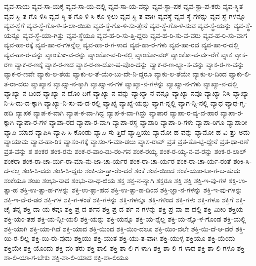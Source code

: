 {ವ್ಯವ-ಸಾಯ
ವ್ಯವ-ಸಾ-ಯಕ್ಕೆ
ವ್ಯವ-ಸಾ-ಯ-ದಲ್ಲಿ
ವ್ಯವ-ಸಾ-ಯ-ವನ್ನು
ವ್ಯವ-ಸ್ಥಾ-ಪಕ
ವ್ಯವ-ಸ್ಥಾ-ಪ-ಕರು
ವ್ಯವ-ಸ್ಥಿತ
ವ್ಯವ-ಸ್ಥಿ-ತ-ಗೊ-ಳಿಸಿ
ವ್ಯವ-ಸ್ಥಿ-ತ-ಗೊ-ಳಿ-ಸಿ-ಕೊ-ಳ್ಳಲು
ವ್ಯವ-ಸ್ಥಿ-ತ-ವಾಗಿ
ವ್ಯವಸ್ಥೆ
ವ್ಯವ-ಸ್ಥೆ-ಗಳನ್ನು
ವ್ಯವ-ಸ್ಥೆ-ಗಳನ್ನೂ
ವ್ಯವ-ಸ್ಥೆಗೆ
ವ್ಯವ-ಸ್ಥೆ-ಗೊ-ಳಿ-ಸ-ಲಾ-ಯಿತು
ವ್ಯವ-ಸ್ಥೆ-ಗೊ-ಳಿ-ಸು-ತ್ತೇನೆ
ವ್ಯವ-ಸ್ಥೆ-ಗೊ-ಳಿ-ಸುವ
ವ್ಯವ-ಸ್ಥೆ-ಯನ್ನು
ವ್ಯವ-ಸ್ಥೆ-ಯನ್ನೂ
ವ್ಯವ-ಸ್ಥೆ-ಯಾ-ಗಿತ್ತು
ವ್ಯವ-ಸ್ಥೆಯೂ
ವ್ಯವ-ಹ-ರಿ-ಸು-ತ್ತಿ-ದ್ದರು
ವ್ಯವ-ಹ-ರಿ-ಸು-ವ-ವರು
ವ್ಯವ-ಹ-ರಿ-ಸು-ವಾಗ
ವ್ಯವ-ಹಾ-ರಕ್ಕೆ
ವ್ಯವ-ಹಾ-ರ-ಗಳನ್ನೆಲ್ಲ
ವ್ಯವ-ಹಾ-ರ-ಗ-ಳಾದ
ವ್ಯವ-ಹಾ-ರ-ಗಳು
ವ್ಯವ-ಹಾ-ರದ
ವ್ಯವ-ಹಾ-ರ-ದಲ್ಲಿ
ವ್ಯವ-ಹಾ-ರ-ವನ್ನು
ವ್ಯಾಂಕೋ-ವ-ರನ್ನು
ವ್ಯಾಂಕೋ-ವ-ರಿ-ನಲ್ಲಿ
ವ್ಯಾಂಕೋ-ವರ್
ವ್ಯಾಂಕೋ-ವ-ರ್ವ-ರೆಗೆ
ವ್ಯಾಕ
ವ್ಯಾಕ-ರಣ
ವ್ಯಾಕ-ರ-ಣಕ್ಕೆ
ವ್ಯಾಕ-ರ-ಣದ
ವ್ಯಾಕ-ರ-ಣ-ದೋ-ಷ-ವೊಂ-ದನ್ನು
ವ್ಯಾಕ-ರ-ಣ-ಭ್ಯಾ-ಸ-ವನ್ನು
ವ್ಯಾಕ-ರ-ಣ-ವನ್ನು
ವ್ಯಾಕ-ರ-ಣವೇ
ವ್ಯಾಕು-ಲ-ತೆಯ
ವ್ಯಾಕು-ಲ-ತೆ-ಯೆಂ-ಬು-ದೇ-ನಿ-ದ್ದರೂ
ವ್ಯಾಕು-ಲ-ತೆಯೇ
ವ್ಯಾಕು-ಲ-ದಿಂದ
ವ್ಯಾಕು-ಲಿ-ತ-ರಾ-ದರು
ವ್ಯಾಖ್ಯಾನ
ವ್ಯಾಖ್ಯಾ-ನ-ಕ್ಕಾಗಿ
ವ್ಯಾಖ್ಯಾ-ನ-ಗಳ
ವ್ಯಾಖ್ಯಾ-ನ-ಗಳನ್ನು
ವ್ಯಾಖ್ಯಾ-ನ-ಗಳು
ವ್ಯಾಖ್ಯಾ-ನ-ದಲ್ಲಿ
ವ್ಯಾಖ್ಯಾ-ನ-ದಿಂದ
ವ್ಯಾಖ್ಯಾ-ನ-ದೊಂ-ದಿಗೆ
ವ್ಯಾಖ್ಯಾ-ನ-ವನ್ನು
ವ್ಯಾಖ್ಯಾ-ನ-ವನ್ನೂ
ವ್ಯಾಖ್ಯಾ-ನವೂ
ವ್ಯಾಖ್ಯಾ-ನಿಸಿ
ವ್ಯಾಖ್ಯಾ-ನಿ-ಸಿ-ದು-ದ-ಕ್ಕಾಗಿ
ವ್ಯಾಖ್ಯಾ-ನಿ-ಸು-ವು-ದ-ರಲ್ಲಿ
ವ್ಯಾಖ್ಯೆ
ವ್ಯಾಖ್ಯೆ-ಯನ್ನು
ವ್ಯಾಗ-ನ್ನಲ್ಲಿ
ವ್ಯಾಗ-ನ್ನಿ-ನಲ್ಲಿ
ವ್ಯಾಧ
ವ್ಯಾಧ-ಗೃ-ಹದಿ
ವ್ಯಾಪಕ
ವ್ಯಾಪ-ಕ-ವಾಗಿ
ವ್ಯಾಪ-ಕ-ವಾ-ಗಿದ್ದ
ವ್ಯಾಪ-ಕ-ವಾ-ಗಿದ್ದು
ವ್ಯಾಪಾರ
ವ್ಯಾಪಾ-ರ-ವ್ಯ-ವ-ಹಾರ
ವ್ಯಾಪಾ-ರ-ಕ್ಕಾಗಿ
ವ್ಯಾಪಾ-ರ-ಗಳ
ವ್ಯಾಪಾ-ರದ
ವ್ಯಾಪಾ-ರ-ವಾಗಿ
ವ್ಯಾಪಾ-ರಸ್ಥ
ವ್ಯಾಪಾರಿ
ವ್ಯಾಪಾ-ರಿ-ಗಳು
ವ್ಯಾಪಾ-ರಿಗೂ
ವ್ಯಾಪಾರೀ
ವ್ಯಾಪಿ-ಯಾದ
ವ್ಯಾಪಿಸಿ
ವ್ಯಾಪಿ-ಸಿ-ಕೊಂಡು
ವ್ಯಾಪಿ-ಸು-ತ್ತಿದೆ
ವ್ಯಾಪ್ತಿಯು
ವ್ಯಾಮೋ-ಹ-ವನ್ನು
ವ್ಯಾಮೋ-ಹ-ವಿ-ತ್ತು-ಅದು
ವ್ಯಾಯಾಮ
ವ್ಯಾವ-ಹಾ-ರಿಕ
ವ್ಯಾಸಂ-ಗಕ್ಕೆ
ವ್ಯಾಸಂ-ಗ-ಮಾ-ಡಲು
ವ್ಯಾಸ-ರಾವ್
ವ್ರತ
ವ್ರತ-ತೊ-ಟ್ಟಿ-ದ್ದೇನೆ
ವ್ರತ-ಧಾ-ರಣೆ
ವ್ರತ-ವನ್ನು
ಶ
ಶಂಕರ
ಶಂಕ-ರನು
ಶಂಕ-ರ-ಪಾಂ-ಡು-ರಂ-ಗನ
ಶಂಕ-ರಯ್ಯ
ಶಂಕ-ರ-ಯ್ಯ-ನ-ವ-ರನ್ನು
ಶಂಕ-ರ-ಲಾಲ್
ಶಂಕರಾ
ಶಂಕ-ರಾ-ಚಾ-ರ್ಯ-ರಾ-ಮಾ-ನು-ಜಾ-ಚಾ-ರ್ಯರ
ಶಂಕ-ರಾ-ಚಾ-ರ್ಯರ
ಶಂಕ-ರಾ-ಚಾ-ರ್ಯ-ರಂತೆ
ಶಂಕಿ-ಸಿ-ದ-ನಲ್ಲ
ಶಂಕಿ-ಸಿ-ದರು
ಶಂಕಿ-ಸಿ-ದ್ದರು
ಶಂಕಿ-ಸು-ತ್ತಾ-ರೆಂ-ದರೆ
ಶಂಕೆ
ಶಂಕೆ-ಯಿಂದ
ಶಂಕೆ-ಯುಂ-ಟಾ-ಗ-ಬ-ಹುದು
ಶಂಕೆಯೂ
ಶಂಖ
ಶಂಭು-ನಾಥ
ಶಂಭು-ನಾ-ಥ-ಜಿಯ
ಶಕ್ತ
ಶಕ್ತ-ನ-ನ್ನಾಗಿ
ಶಕ್ತರೂ
ಶಕ್ತಿ
ಶಕ್ತಿ
ಶಕ್ತಿ-ಇ-ವು-ಗಳ
ಶಕ್ತಿ-ಉ-ತ್ಸಾ-ಹ
ಶಕ್ತಿ-ಉ-ತ್ಸಾ-ಹ-ಗಳನ್ನು
ಶಕ್ತಿ-ಉ-ತ್ಸಾ-ಹದ
ಶಕ್ತಿ-ಉ-ತ್ಸಾ-ಹ-ದಿಂದ
ಶಕ್ತಿ-ಜ್ಞಾ-ನ-ಗಳನ್ನು
ಶಕ್ತಿ-ಇ-ವು-ಗಳನ್ನು
ಶಕ್ತಿ-ಇ-ವೆ-ರ-ಡರ
ಶಕ್ತಿ-ಗಳ
ಶಕ್ತಿ-ಗ-ಳಂತೆ
ಶಕ್ತಿ-ಗಳನ್ನು
ಶಕ್ತಿ-ಗಳನ್ನೂ
ಶಕ್ತಿ-ಗಳಿಂದ
ಶಕ್ತಿ-ಗಳು
ಶಕ್ತಿ-ಗಳೂ
ಶಕ್ತಿಗೆ
ಶಕ್ತಿ-ಚೈ-ತನ್ಯ
ಶಕ್ತಿ-ದಾ-ಯ-ಕವೂ
ಶಕ್ತಿ-ಪ್ರ-ದ-ರ್ಶನ
ಶಕ್ತಿ-ಪ್ರ-ದ-ರ್ಶ-ನ-ಗಳನ್ನು
ಶಕ್ತಿ-ಪ್ರ-ವಾ-ಹ-ದಲ್ಲಿ
ಶಕ್ತಿ-ಮೀರಿ
ಶಕ್ತಿಯ
ಶಕ್ತಿ-ಯಂ-ತಹ
ಶಕ್ತಿ-ಯ-ನ್ನೀ-ಯಲಿ
ಶಕ್ತಿ-ಯನ್ನು
ಶಕ್ತಿ-ಯನ್ನೂ
ಶಕ್ತಿ-ಯ-ನ್ನೆಲ್ಲ
ಶಕ್ತಿ-ಯ-ನ್ನೊ-ಳ-ಗೊಂಡ
ಶಕ್ತಿ-ಯಲ್ಲಿ
ಶಕ್ತಿ-ಯಾಗಿ
ಶಕ್ತಿ-ಯಾ-ಗಿದೆ
ಶಕ್ತಿ-ಯಾದ
ಶಕ್ತಿ-ಯಿಂದ
ಶಕ್ತಿ-ಯಿಂ-ದಲೂ
ಶಕ್ತಿ-ಯಿಂ-ದಲೇ
ಶಕ್ತಿ-ಯಿ-ದೆ-ಆ-ದರೆ
ಶಕ್ತಿ-ಯಿ-ರ-ಲಿಲ್ಲ
ಶಕ್ತಿ-ಯಿ-ರು-ವುದು
ಶಕ್ತಿಯು
ಶಕ್ತಿ-ಯುತ
ಶಕ್ತಿ-ಯು-ತ-ವಾಗಿ
ಶಕ್ತಿ-ಯುಳ್ಳ
ಶಕ್ತಿಯೂ
ಶಕ್ತಿ-ಯೆಂದು
ಶಕ್ತಿಯೇ
ಶಕ್ತಿ-ಯೊಂದು
ಶಕ್ತಿ-ವಂ-ತರು
ಶಕ್ತಿ-ಶಾಲಿ
ಶಕ್ತಿ-ಶಾ-ಲಿ-ಗ-ಳಾಗಿ
ಶಕ್ತಿ-ಶಾ-ಲಿ-ಗ-ಳಾದ
ಶಕ್ತಿ-ಶಾ-ಲಿ-ಗಳೂ
ಶಕ್ತಿ-ಶಾ-ಲಿ-ಯಾ-ಗ-ಬೇಕು
ಶಕ್ತಿ-ಶಾ-ಲಿ-ಯಾದ
ಶಕ್ತಿ-ಶಾ-ಲಿಯೂ
}
